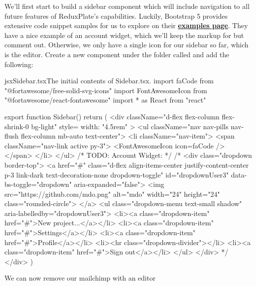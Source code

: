 \documentclass[a4paper,headinclude=on,footinclude=on,12pt,oneside]{scrbook}
\newcommand{\link}[2]{\textbf{\textcolor{monokaiPink}{\href{#2}{#1}}}}
\begin{document}

We'll first start to build a sidebar component which will include navigation to all future features of ReduxPlate's capabilities. Luckily, Bootstrap 5 provides extensive code snippet samples for us to explore on their \link{examples page}{https://getbootstrap.com/docs/5.0/examples/\#snippets}. They have a nice example of an account widget, which we'll keep the markup for but comment out. Otherwise, we only have a single icon for our sidebar so far, which is the editor. Create a new component under the  folder called  and add the following:

\begin{codeInput}{jsx}{Sidebar.tsx}{The initial contents of Sidebar.tsx.}
import { faCode } from "@fortawesome/free-solid-svg-icons"
import { FontAwesomeIcon } from "@fortawesome/react-fontawesome"
import * as React from "react"

export function Sidebar() {
  return (
    <div
      className="d-flex flex-column flex-shrink-0 bg-light"
      style={{ width: "4.5rem" }}
    >
      <ul className="nav nav-pills nav-flush flex-column mb-auto text-center">
        <li className="nav-item">
          <span className="nav-link active py-3">
            <FontAwesomeIcon icon={faCode} />
          </span>
        </li>
      </ul>
      {/* TODO: Account Widget: */}
      {/* <div class="dropdown border-top">
      <a href="#" class="d-flex align-items-center justify-content-center p-3 link-dark text-decoration-none dropdown-toggle" id="dropdownUser3" data-bs-toggle="dropdown" aria-expanded="false">
        <img src="https://github.com/mdo.png" alt="mdo" width="24" height="24" class="rounded-circle">
      </a>
      <ul class="dropdown-menu text-small shadow" aria-labelledby="dropdownUser3">
        <li><a class="dropdown-item" href="#">New project...</a></li>
        <li><a class="dropdown-item" href="#">Settings</a></li>
        <li><a class="dropdown-item" href="#">Profile</a></li>
        <li><hr class="dropdown-divider"></li>
        <li><a class="dropdown-item" href="#">Sign out</a></li>
      </ul>
    </div> */}
    </div>
  )
}  
\end{codeInput}


We can now remove our mailchimp with an editor

\end{document}
